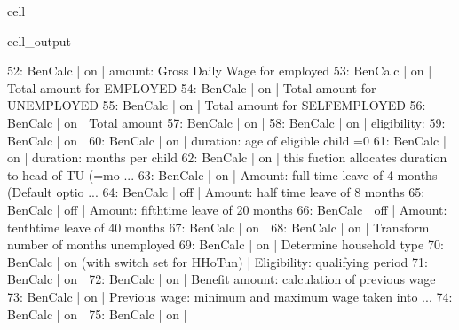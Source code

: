 \documentclass[letterpaper,10pt,english]{sphinxmanual}
\begin{document}
\begin{sphinxuseclass}{cell}
\begin{sphinxuseclass}{cell_output}
\begin{sphinxVerbatim}[commandchars=\\\{\}]
52: BenCalc      | on                                                       |    amount: Gross Daily Wage for employed 
53: BenCalc      | on                                                       |    Total amount for EMPLOYED 
54: BenCalc      | on                                                       |    Total amount for UNEMPLOYED 
55: BenCalc      | on                                                       |    Total amount for SELF\PYGZhy{}EMPLOYED 
56: BenCalc      | on                                                       |    Total amount 
57: BenCalc      | on                                                       |     
58: BenCalc      | on                                                       |    eligibility: 
59: BenCalc      | on                                                       |     
60: BenCalc      | on                                                       |    duration: age of eligible child =0 
61: BenCalc      | on                                                       |    duration: months per child 
62: BenCalc      | on                                                       |    this fuction allocates duration to head of TU (=mo ... 
63: BenCalc      | on                                                       |    Amount: full time leave of 4 months (Default optio ... 
64: BenCalc      | off                                                      |    Amount: half time leave of 8 months 
65: BenCalc      | off                                                      |    Amount: fifthtime leave of 20 months 
66: BenCalc      | off                                                      |    Amount: tenthtime leave of 40 months 
67: BenCalc      | on                                                       |     
68: BenCalc      | on                                                       |    Transform number of months unemployed 
69: BenCalc      | on                                                       |    Determine household type 
70: BenCalc      | on (with switch set for HHoT\PYGZus{}un)                         |    Eligibility: qualifying period 
71: BenCalc      | on                                                       |     
72: BenCalc      | on                                                       |    Benefit amount: calculation of previous wage 
73: BenCalc      | on                                                       |    Previous wage: minimum and maximum wage taken into ... 
74: BenCalc      | on                                                       |     
75: BenCalc      | on                                                       |     

\end{sphinxVerbatim}
\end{sphinxuseclass}
\end{sphinxuseclass}
\end{document}

